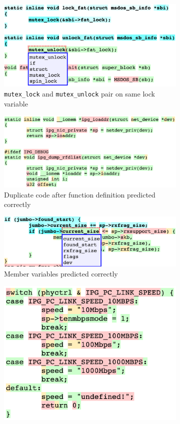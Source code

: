 \begin{figure}
  \centering
\begin{subfigure}{\linewidth}
  \includegraphics[width=\linewidth]{figs/example10.png}
  \caption{{\tt mutex\_lock} and {\tt mutex\_unlock} pair on same lock variable}
  \label{fig:lockunlock}
\end{subfigure}
\begin{subfigure}{\linewidth}
  \includegraphics[width=\linewidth]{figs/example4.png}
  \caption{Duplicate code after function definition predicted correctly}
  \label{fig:duplicate}
\end{subfigure}
\begin{subfigure}{\linewidth}
  \includegraphics[width=\linewidth]{figs/example7.png}
  \caption{Member variables predicted correctly}
  \label{fig:memvar}
\end{subfigure}
\begin{subfigure}{\linewidth}
  \includegraphics[width=0.6\linewidth]{figs/example1.png}

\end{subfigure}
\end{figure}
